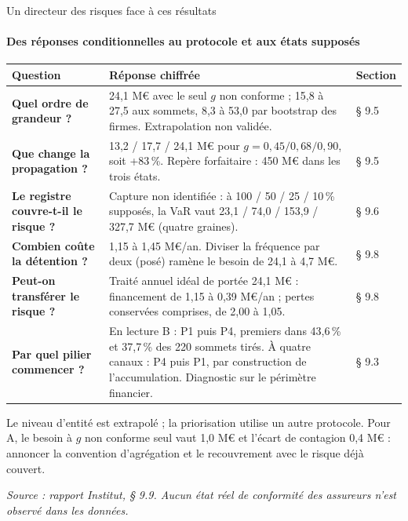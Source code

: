 \documentclass[aspectratio=169,10pt,t]{beamer}
\newcommand{\source}[1]{\par\vfill{\tiny\color{gris}\textit{Source : #1}}\par\vspace{-1mm}}
\renewcommand{\arraystretch}{1.25}
\begin{document}
\begin{frame}{Un directeur des risques face à ces résultats}
  \framesubtitle{\ajout Des réponses conditionnelles au protocole et aux états supposés}
  \scriptsize
  \renewcommand{\arraystretch}{1.12}
  \begin{tabularx}{\linewidth}{@{}>{\bfseries}p{.22\linewidth} Y p{.08\linewidth}@{}}
    \toprule
    Question & Réponse chiffrée & Section \\
    \midrule
    Quel ordre de grandeur ? & 24,1 M€ avec le seul $g$ non conforme ; 15,8 à 27,5 aux sommets, 8,3 à 53,0 par bootstrap des firmes. Extrapolation non validée. & § 9.5 \\
    Que change la propagation ? & 13,2 / 17,7 / 24,1 M€ pour $g=0{,}45/0{,}68/0{,}90$, soit +83\,\%. Repère forfaitaire : 450 M€ dans les trois états. & § 9.5 \\
    Le registre couvre-t-il le risque ? & Capture non identifiée : à 100 / 50 / 25 / 10\,\% supposés, la VaR vaut 23,1 / 74,0 / 153,9 / 327,7 M€ (quatre graines). & § 9.6 \\
    Combien coûte la détention ? & 1,15 à 1,45 M€/an. Diviser la fréquence par deux (posé) ramène le besoin de 24,1 à 4,7 M€. & § 9.8 \\
    Peut-on transférer le risque ? & Traité annuel idéal de portée 24,1 M€ : financement de 1,15 à 0,39 M€/an ; pertes conservées comprises, de 2,00 à 1,05. & § 9.8 \\
    Par quel pilier commencer ? & En lecture B : P1 puis P4, premiers dans 43,6\,\% et 37,7\,\% des 220 sommets tirés. À quatre canaux : P4 puis P1, par construction de l'accumulation. Diagnostic sur le périmètre financier. & § 9.3 \\
    \bottomrule
  \end{tabularx}\par\vspace{1.3mm}
  Le niveau d'entité est extrapolé ; la priorisation utilise un autre protocole. Pour A, le besoin à $g$ non conforme seul vaut 1,0 M€ et l'écart de contagion 0,4 M€ : annoncer la convention d'agrégation et le recouvrement avec le risque déjà couvert.
  \source{rapport Institut, § 9.9. Aucun état réel de conformité des assureurs n'est observé dans les données.}
\end{frame}


\end{document}
